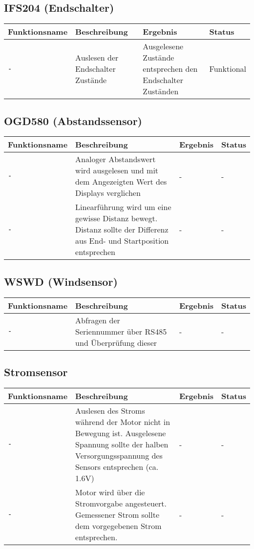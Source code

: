 \documentclass{article}
\begin{document}
	\subsection{IFS204 (Endschalter)}
		\begin{tabular}{|p{2.7cm}|p{5.5cm}|p{4cm}| p{1.6cm} |}
			\hline
				\textbf{Funktionsname} & \textbf{Beschreibung} & \textbf{Ergebnis} & \textbf{Status} \\
			\hline
				 \texttt{-} & Auslesen der Endschalter Zustände & Ausgelesene Zustände entsprechen den Endschalter Zuständen & Funktional \\
			 \hline
		\end{tabular}
	\subsection{OGD580 (Abstandssensor)}
		\begin{tabular}{|p{2.7cm}|p{5.5cm}|p{4cm}| p{1.6cm} |}
			\hline
				\textbf{Funktionsname} & \textbf{Beschreibung} & \textbf{Ergebnis} & \textbf{Status} \\
			\hline
				\texttt{-} & Analoger Abstandswert wird ausgelesen und mit dem Angezeigten Wert des Displays verglichen & - & - \\
			\hline
				\texttt{-} & Linearführung wird um eine gewisse Distanz bewegt. Distanz sollte der Differenz aus End- und Startposition entsprechen & - & - \\
			\hline
		\end{tabular}
	\subsection{WSWD (Windsensor)}
		\begin{tabular}{|p{2.7cm}|p{5.5cm}|p{4cm}| p{1.6cm} |}
			\hline
				\textbf{Funktionsname} & \textbf{Beschreibung} & \textbf{Ergebnis} & \textbf{Status} \\
			\hline
				\texttt{-} & Abfragen der Seriennummer über RS485 und Überprüfung dieser & - & - \\
			\hline
		\end{tabular}
	\subsection{Stromsensor}
		\begin{tabular}{|p{2.7cm}|p{5.5cm}|p{4cm}| p{1.6cm} |}
			\hline
				\textbf{Funktionsname} & \textbf{Beschreibung} & \textbf{Ergebnis} & \textbf{Status} \\
			\hline
				\texttt{-} & Auslesen des Stroms während der Motor nicht in Bewegung ist. Ausgelesene Spannung sollte der halben Versorgungsspannung des Sensors entsprechen (ca. 1.6V) & - & - \\
			\hline
				\texttt{-} & Motor wird über die Stromvorgabe angesteuert. Gemessener Strom sollte dem vorgegebenen Strom entsprechen. & - & - \\
			\hline
		\end{tabular} 
\end{document}
